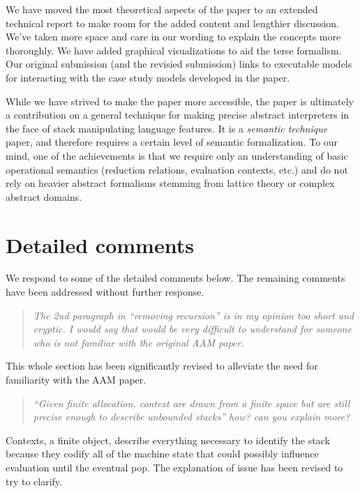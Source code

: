 \begin{titlepage}
We have moved the most theoretical aspects of the paper to an extended
technical report to make room for the added content and lengthier
discussion.  We've taken more space and care in our wording to explain
the concepts more thoroughly.  We have added graphical visualizations
to aid the terse formalism.  Our original submission (and the revisied
submission) links to executable models for interacting with the case
study models developed in the paper.

While we have strived to make the paper more accessible, the paper is
ultimately a contribution on a general technique for making precise
abstract interpreters in the face of stack manipulating language
features.  It is a \emph{semantic technique} paper, and therefore
requires a certain level of semantic formalization.  To our mind, one
of the achievements is that we require only an understanding of basic
operational semantics (reduction relations, evaluation contexts, etc.)
and do not rely on heavier abstract formalisms stemming from lattice
theory or complex abstract domains.


\section*{Detailed comments}

We respond to some of the detailed comments below.  The remaining
comments have been addressed without further response.

\begin{quote}
\emph{
  The 2nd paragraph in ``removing recursion'' is in my opinion too short and cryptic. I would say that would be very difficult to understand for someone who is not familiar with the original AAM paper.}
\end{quote}

This whole section has been significantly revised to alleviate the
need for familiarity with the AAM paper.

\begin{quote}
\emph{``Given finite allocation, context are drawn from a finite space
  but are still precise enough to describe unbounded stacks'' how?
  can you explain more?}
\end{quote}

Contexts, a finite object, describe everything necessary to identify
the stack because they codify all of the machine state that could
possibly influence evaluation until the eventual pop.  The explanation
of issue has been revised to try to clarify.


\end{titlepage}
